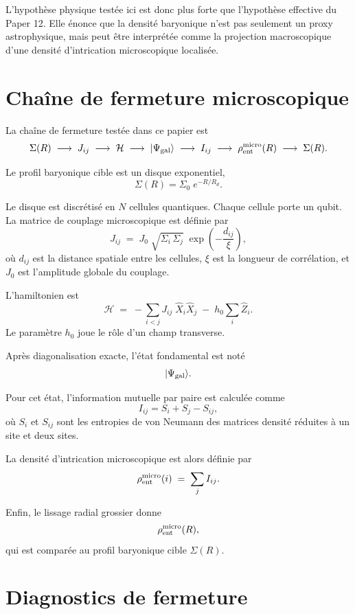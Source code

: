 \documentclass[11pt]{article}
\begin{document}
L'hypothèse physique testée ici est donc plus forte que l'hypothèse effective du Paper 12. Elle énonce que la densité baryonique n'est pas seulement un proxy astrophysique, mais peut être interprétée comme la projection macroscopique d'une densité d'intrication microscopique localisée.

\section{Chaîne de fermeture microscopique}

La chaîne de fermeture testée dans ce papier est
\[
\Sigma(R)
\;\longrightarrow\;
J_{ij}
\;\longrightarrow\;
\mathcal{H}
\;\longrightarrow\;
|\Psi_{\rm gal}\rangle
\;\longrightarrow\;
I_{ij}
\;\longrightarrow\;
\rho_{\rm ent}^{\rm micro}(R)
\;\longrightarrow\;
\Sigma(R).
\]

Le profil baryonique cible est un disque exponentiel,
\[
\Sigma(R) = \Sigma_0 \; e^{-R/R_d}.
\]

Le disque est discrétisé en \(N\) cellules quantiques. Chaque cellule porte un qubit. La matrice de couplage microscopique est définie par
\[
J_{ij}
\;=\;
J_0 \;
\sqrt{\Sigma_i \,\Sigma_j} \;
\exp\!\left(-\frac{d_{ij}}{\xi}\right),
\]
où \(d_{ij}\) est la distance spatiale entre les cellules, \(\xi\) est la longueur de corrélation, et \(J_0\) est l'amplitude globale du couplage.

L'hamiltonien est
\[
\mathcal{H}
\;=\;
- \sum_{i<j} J_{ij} \;\hat{X}_i \hat{X}_j
\;-\;
h_0 \sum_i \hat{Z}_i.
\]
Le paramètre \(h_0\) joue le rôle d'un champ transverse.

Après diagonalisation exacte, l'état fondamental est noté
\[
|\Psi_{\rm gal}\rangle.
\]

Pour cet état, l'information mutuelle par paire est calculée comme
\[
I_{ij} = S_i + S_j - S_{ij},
\]
où \(S_i\) et \(S_{ij}\) sont les entropies de von Neumann des matrices densité réduites à un site et deux sites.

La densité d'intrication microscopique est alors définie par
\[
\rho_{\rm ent}^{\rm micro}(i) \;=\; \sum_j I_{ij}.
\]

Enfin, le lissage radial grossier donne
\[
\rho_{\rm ent}^{\rm micro}(R),
\]
qui est comparée au profil baryonique cible \(\Sigma(R)\).

\section{Diagnostics de fermeture}
\end{document}
